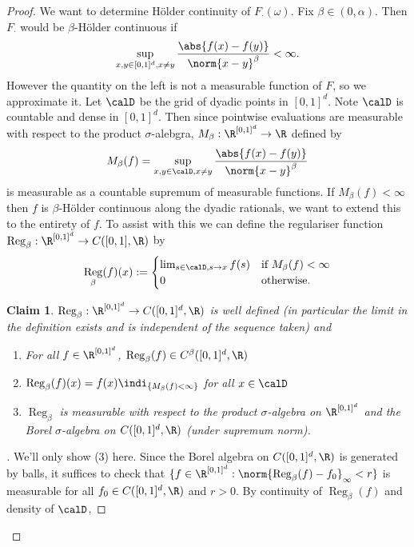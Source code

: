 \documentclass[fontsize=12pt, DIV=10]{scrreprt}
\theoremstyle{mydefn}
\newtheorem{claim}{Claim}
\theoremstyle{remark}
\newenvironment{subproof}[1][\proofname]{%
  \renewcommand{\qedsymbol}{$\blacksquare$}%
  \begin{proof}[#1]%
}{%
  \end{proof}%
}
\newcommand{\defeq}{:=}
\DeclareMathOperator{\reg}{Reg}
\begin{document}
\begin{proof}
	We want to determine H\"older continuity of $F_{\cdot}(\omega)$. Fix $\beta \in (0, \alpha)$. Then $F_{\cdot}$ would be $\beta$-H\"older continuous if
	\begin{equation}
		\sup_{x, y \in [0, 1]^d, x \neq y} \frac{\abs{f(x) - f(y)}}{\norm{x - y}^{\beta}} < \infty.
	\end{equation}
	However the quantity on the left is not a measurable function of $F$, so we approximate it. Let $\calD$ be the grid of dyadic points in $[0, 1]^d$. Note $\calD$ is countable and dense in $[0, 1]^d$. Then since pointwise evaluations are measurable with respect to the product $\sigma$-alebgra, $M_{\beta}: \boxspace \to \R$ defined by 
	\begin{equation}
		M_{\beta}(f) = \sup_{x, y \in \calD, x \neq y} \frac{\abs{f(x) - f(y)}}{\norm{x - y}^{\beta}}
	\end{equation}
	is measurable as a countable supremum of measurable functions. If $M_{\beta}(f) < \infty$ then $f$ is $\beta$-H\"older continuous along the dyadic rationals, we want to extend this to the entirety of $f$. To assist with this we can define the regulariser function $\reg_{\beta}: \boxspace \to C([0, 1], \R)$ by
	\begin{equation}
		\reg_{\beta}(f)(x) \defeq 
		\begin{cases}
			\lim_{s \in \calD, s \to x} f(s) & \text{if}\ M_{\beta}(f) < \infty \\
			0 & \text{otherwise}.
		\end{cases}
	\end{equation}
	\newcommand{\regindi}{\ensuremath{\indi_{\{M_{\beta}(f) < \infty\}}}}
	\begin{claim}
		$\reg_{\beta}: \boxspace \to C([0, 1]^d, \R)$ is well defined (in particular the limit in the definition exists and is independent of the sequence taken) and 
		\begin{enumerate}
			\item For all $f \in \boxspace$, $\reg_{\beta}(f) \in C^{\beta}([0, 1]^d, \R)$
			\item $\reg_{\beta}(f)(x) = f(x) \regindi$ for all $x \in \calD$
			\item $\reg_{\beta}$ is measurable with respect to the product $\sigma$-algebra on $\boxspace$ and the Borel $\sigma$-algebra on $C([0, 1]^d, \R)$ (under supremum norm).
		\end{enumerate}
	\end{claim}
	\begin{subproof}
	We'll only show (3) here. Since the Borel algebra on $C([0, 1]^d, \R)$ is generated by balls, it suffices to check that $\{f \in \boxspace : \norm{\reg_{\beta}(f) - f_0}_{\infty} < r\}$ is measurable for all $f_0 \in C([0, 1]^d, \R)$ and $r > 0$. By continuity of $\reg_{\beta}(f)$ and density of $\calD$,

\end{subproof}
\end{proof}
\end{document}
